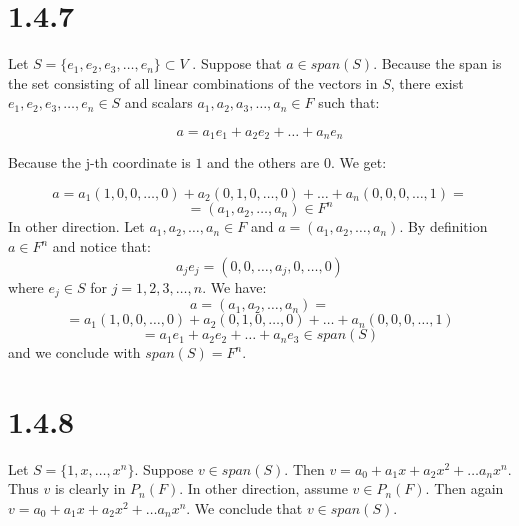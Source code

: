 \documentclass{article}
\begin{document}
\section*{1.4.7}

Let \(S = \{ e_{1}, e_{2}, e_{3}, \dots, e_{n} \} \subset V \) .
Suppose that \(a \in span(S)\). Because the span is the set consisting of all linear combinations of the vectors in \(S\),
there exist \(e_{1}, e_{2}, e_{3}, \dots, e_{n} \in S\) and scalars \(a_{1}, a_{2}, a_{3}, \dots, a_{n} \in F\) such that:

\begin{equation*}
    a = a_{1}e_{1} + a_{2}e_{2} + \dots + a_{n}e_{n} 
\end{equation*}

Because the j-th coordinate is \(1\) and the others are \(0\). We get:

\begin{equation*}
    a = a_{1}(1, 0, 0, \dots, 0) + a_{2}(0, 1, 0, \dots, 0) + \dots + a_{n}(0, 0, 0, \dots, 1) = 
\end{equation*}
\begin{equation*}
    = (a_{1}, a_{2}, \dots, a_{n}) \in F^{n}
\end{equation*}
In other direction. Let \(a_{1}, a_{2}, \dots, a_{n} \in F\) and \(a = (a_{1}, a_{2}, \dots, a_{n})\). By definition \(a \in F^{n}\) and notice that:
\begin{equation*}
    a_{j}e_{j} = (0, 0, \dots, a_{j}, 0, \dots, 0) 
\end{equation*}
where \(e_{j} \in S\) for \(j=1, 2, 3, \dots, n\). We have:
\begin{equation*}
    a = (a_{1}, a_{2}, \dots, a_{n}) = 
\end{equation*}
\begin{equation*}
    = a_{1}(1, 0, 0, \dots, 0) + a_{2}(0, 1, 0, \dots, 0) + \dots + a_{n}(0, 0, 0, \dots, 1)
\end{equation*}
\begin{equation*}
    = a_{1}e_{1} + a_{2}e_{2} + \dots + a_{n}e_{3}  \in span(S)
\end{equation*}
and we conclude with \(span(S) = F^{n}\).



\section*{1.4.8}

Let \(S = \{ 1, x, \dots, x^{n} \}\). Suppose \(v \in span(S)\). Then \(v = a_{0} + a_{1}x + a_{2}x^{2} + \dots a_{n}x^{n}\). Thus
\(v\) is clearly in \(P_{n}(F)\). In other direction, assume \(v \in P_{n}(F)\). Then again \(v = a_{0} + a_{1}x + a_{2}x^{2} + \dots a_{n}x^{n}\).
We conclude that \(v \in span(S)\).
\end{document}

